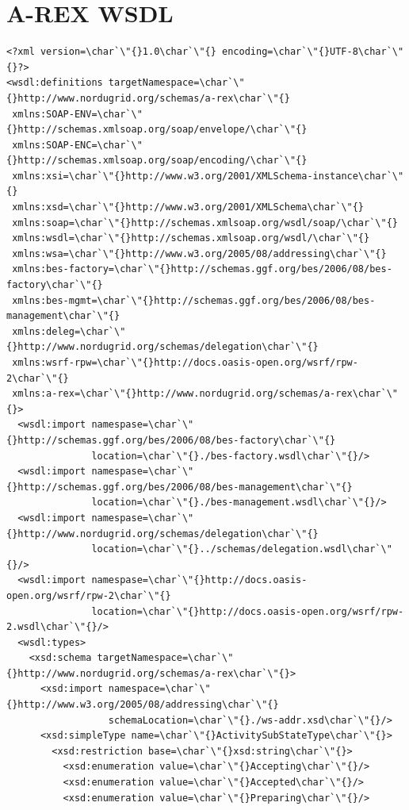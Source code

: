\documentclass{article}                            %
\begin{document}
\section{A-REX WSDL\label{annex:arex-wsdl}}

\begin{footnotesize}\begin{verbatim}
<?xml version=\char`\"{}1.0\char`\"{} encoding=\char`\"{}UTF-8\char`\"{}?>
<wsdl:definitions targetNamespace=\char`\"{}http://www.nordugrid.org/schemas/a-rex\char`\"{}
 xmlns:SOAP-ENV=\char`\"{}http://schemas.xmlsoap.org/soap/envelope/\char`\"{}
 xmlns:SOAP-ENC=\char`\"{}http://schemas.xmlsoap.org/soap/encoding/\char`\"{}
 xmlns:xsi=\char`\"{}http://www.w3.org/2001/XMLSchema-instance\char`\"{}
 xmlns:xsd=\char`\"{}http://www.w3.org/2001/XMLSchema\char`\"{}
 xmlns:soap=\char`\"{}http://schemas.xmlsoap.org/wsdl/soap/\char`\"{}
 xmlns:wsdl=\char`\"{}http://schemas.xmlsoap.org/wsdl/\char`\"{}
 xmlns:wsa=\char`\"{}http://www.w3.org/2005/08/addressing\char`\"{}
 xmlns:bes-factory=\char`\"{}http://schemas.ggf.org/bes/2006/08/bes-factory\char`\"{}
 xmlns:bes-mgmt=\char`\"{}http://schemas.ggf.org/bes/2006/08/bes-management\char`\"{}
 xmlns:deleg=\char`\"{}http://www.nordugrid.org/schemas/delegation\char`\"{}
 xmlns:wsrf-rpw=\char`\"{}http://docs.oasis-open.org/wsrf/rpw-2\char`\"{}
 xmlns:a-rex=\char`\"{}http://www.nordugrid.org/schemas/a-rex\char`\"{}>
  <wsdl:import namespase=\char`\"{}http://schemas.ggf.org/bes/2006/08/bes-factory\char`\"{}
               location=\char`\"{}./bes-factory.wsdl\char`\"{}/>
  <wsdl:import namespase=\char`\"{}http://schemas.ggf.org/bes/2006/08/bes-management\char`\"{}
               location=\char`\"{}./bes-management.wsdl\char`\"{}/>
  <wsdl:import namespase=\char`\"{}http://www.nordugrid.org/schemas/delegation\char`\"{}
               location=\char`\"{}../schemas/delegation.wsdl\char`\"{}/>
  <wsdl:import namespase=\char`\"{}http://docs.oasis-open.org/wsrf/rpw-2\char`\"{}
               location=\char`\"{}http://docs.oasis-open.org/wsrf/rpw-2.wsdl\char`\"{}/>
  <wsdl:types>
    <xsd:schema targetNamespace=\char`\"{}http://www.nordugrid.org/schemas/a-rex\char`\"{}>
      <xsd:import namespace=\char`\"{}http://www.w3.org/2005/08/addressing\char`\"{}
                  schemaLocation=\char`\"{}./ws-addr.xsd\char`\"{}/>
      <xsd:simpleType name=\char`\"{}ActivitySubStateType\char`\"{}>
        <xsd:restriction base=\char`\"{}xsd:string\char`\"{}>
          <xsd:enumeration value=\char`\"{}Accepting\char`\"{}/>
          <xsd:enumeration value=\char`\"{}Accepted\char`\"{}/>
          <xsd:enumeration value=\char`\"{}Preparing\char`\"{}/>

\end{verbatim}
\end{footnotesize}
\end{document}
